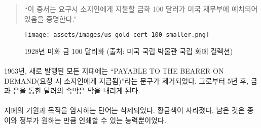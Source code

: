 \begin{comment}
	\begin{quotation}\begin{samepage}
			\enquote{This certifies that there have been deposited in the treasury of the
				United States of America one hundred dollars in gold coin payable to
				the bearer on demand.}
	\end{samepage}\end{quotation}
\end{comment}
\begin{quotation}\begin{samepage}
		\enquote{이 증서는 요구시 소지인에게 지불할 금화 100 달러가 미국 재무부에 예치되어 있음을 증명한다.}
\end{samepage}\end{quotation}

\begin{comment}
	\begin{figure}
		\centering
		\texttt{[image: assets/images/us-gold-cert-100-smaller.png]}
		\caption{A 1928 U.S. \$100 gold certificate. Picture cc-by-sa National Numismatic Collection, National Museum of American History.}
		\label{fig:us-gold-cert-100-smaller}
	\end{figure}
\end{comment}
\begin{figure}
	\centering
	\texttt{[image: assets/images/us-gold-cert-100-smaller.png]}
	\caption{1928년 미화 금 100 달러화 (출처: 미국 국립 박물관 국립 화폐 컬렉션)}
	\label{fig:us-gold-cert-100-smaller}
\end{figure}

\paragraph{}
\begin{comment}
	In 1963, the words \enquote{PAYABLE TO THE BEARER ON DEMAND} were removed from
	all newly issued notes. Five years later, the redemption of paper notes
	for gold and silver ended.
\end{comment}
1963년, 새로 발행된 모든 지폐에는 \enquote{PAYABLE TO THE BEARER ON DEMAND(요청 시 소지인에게 지급됨)}라는 문구가 제거되었다. 
그로부터 5년 후, 금과 은을 통한 달러의 속박은 막을 내리게 된다.

\paragraph{}
\begin{comment}
	The words hinting on the origins and the idea behind paper money were
	removed. The golden color disappeared. All that was left was the paper
	and with it the ability of the government to print as much of it as it
	wishes.
\end{comment}
지폐의 기원과 목적을 암시하는 단어는 삭제되었다. 황금색이 사라졌다. 
남은 것은 종이와 정부가 원하는 만큼 인쇄할 수 있는 능력뿐이었다.

